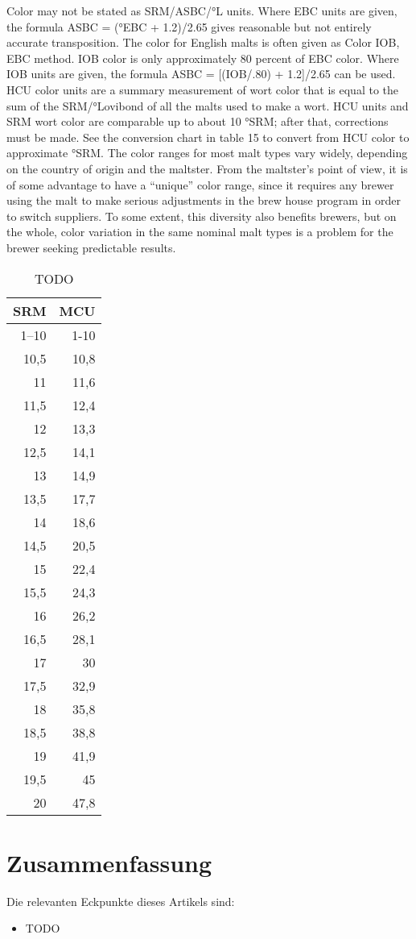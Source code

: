 \documentclass[a4paper,parskip=half]{scrartcl}
\begin{document}
\parencite[11]{Noonan1996}
Color may not be stated as SRM/ASBC/°L units.
Where EBC units are given, the formula ASBC = (°EBC
+ 1.2)/2.65 gives reasonable but not entirely accurate
transposition. The color for English malts is often given as
Color IOB, EBC method. IOB color is only approximately
80 percent of EBC color. Where IOB units are given, the
formula ASBC = [(IOB/.80) + 1.2]/2.65 can be used.
HCU color units are a summary measurement of
wort color that is equal to the sum of the SRM/°Lovibond
of all the malts used to make a wort. HCU units and SRM
wort color are comparable up to about 10 °SRM; after that,
corrections must be made. See the conversion chart in
table 15 to convert from HCU color to approximate °SRM.
The color ranges for most malt types vary widely,
depending on the country of origin and the maltster. From
the maltster’s point of view, it is of some advantage to
have a “unique” color range, since it requires any brewer
using the malt to make serious adjustments in the brew
house program in order to switch suppliers. To some
extent, this diversity also benefits brewers, but on the
whole, color variation in the same nominal malt types is a
problem for the brewer seeking predictable results.


\begin{table}[H]
\centering
\begin{tabular}{rr}
\toprule
\multicolumn{1}{c}{\textbf{SRM}} & \multicolumn{1}{c}{\textbf{MCU}} \\
\midrule
1–10 & 1-10 \\
10,5 & 10,8 \\
11   & 11,6 \\
11,5 & 12,4 \\
12   & 13,3 \\
12,5 & 14,1 \\
13   & 14,9 \\
13,5 & 17,7 \\
14   & 18,6 \\
14,5 & 20,5 \\
15   & 22,4 \\
15,5 & 24,3 \\
16   & 26,2 \\
16,5 & 28,1 \\
17   & 30 \\
17,5 & 32,9 \\
18   & 35,8 \\
18,5 & 38,8 \\
19   & 41,9 \\
19,5 & 45 \\
20   & 47,8 \\
\bottomrule
\end{tabular}
\caption{TODO \parencite[206]{Noonan1996}}
\label{table:noonanmcu}
\end{table}



\section*{Zusammenfassung}

\parencite{BJCP2015}
\parencite{Noonan1996}
\parencite{Bruecklmeier2018}
\parencite{Holle2010}
\parencite{Mosher1994}
\parencite{Daniels1996}


Die relevanten Eckpunkte dieses Artikels sind:

\begin{itemize}
\item TODO
\end{itemize}

\printbibliography[title=Quellen]
\end{document}
